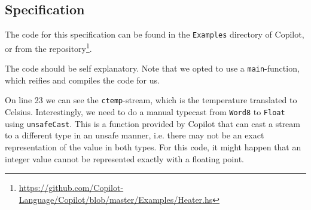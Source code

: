 \subsection{Specification}
The code for this specification can be found in the \texttt{Examples} directory
of Copilot, or from the
repository\footnote{\url{https://github.com/Copilot-Language/Copilot/blob/master/Examples/Heater.hs}}.


%
%
%
%
%
%
%
%
The code should be self explanatory. Note that we opted to use a
\texttt{main}-function, which reifies and compiles the code for us.

On line 23 we can see the \texttt{ctemp}-stream, which is the temperature
translated to Celsius. Interestingly, we need to do a manual typecast from
\texttt{Word8} to \texttt{Float} using \texttt{unsafeCast}. This is a function
provided by Copilot that can cast a stream to a different type in an unsafe
manner, i.e. there may not be an exact representation of the value in both
types. For this code, it might happen that an integer value cannot be
represented exactly with a floating point.


